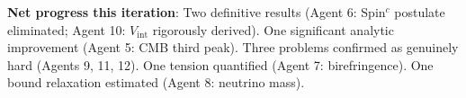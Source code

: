 \documentclass[11pt,a4paper]{article}
\begin{document}
\textbf{Net progress this iteration}: Two definitive results (Agent 6: Spin$^c$ postulate eliminated; Agent 10: $V_{\mathrm{int}}$ rigorously derived). One significant analytic improvement (Agent 5: CMB third peak). Three problems confirmed as genuinely hard (Agents 9, 11, 12). One tension quantified (Agent 7: birefringence). One bound relaxation estimated (Agent 8: neutrino mass).
\end{document}
